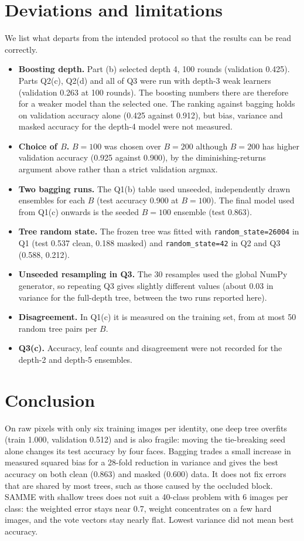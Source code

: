 \documentclass[10pt,twocolumn,letterpaper]{article}
\begin{document}
\section{Deviations and limitations}
\label{sec:limits}
We list what departs from the intended protocol so that the results can be read correctly.
\begin{itemize}\setlength\itemsep{0pt}
\item \textbf{Boosting depth.} Part (b) selected depth 4, 100 rounds (validation 0.425). Parts Q2(c), Q2(d) and all of Q3 were run with depth-3 weak learners (validation 0.263 at 100 rounds). The boosting numbers there are therefore for a weaker model than the selected one. The ranking against bagging holds on validation accuracy alone (0.425 against 0.912), but bias, variance and masked accuracy for the depth-4 model were not measured.
\item \textbf{Choice of $B$.} $B{=}100$ was chosen over $B{=}200$ although $B{=}200$ has higher validation accuracy (0.925 against 0.900), by the diminishing-returns argument above rather than a strict validation argmax.
\item \textbf{Two bagging runs.} The Q1(b) table used unseeded, independently drawn ensembles for each $B$ (test accuracy 0.900 at $B{=}100$). The final model used from Q1(c) onwards is the seeded $B{=}100$ ensemble (test 0.863).
\item \textbf{Tree random state.} The frozen tree was fitted with \texttt{random\_state=26004} in Q1 (test 0.537 clean, 0.188 masked) and \texttt{random\_state=42} in Q2 and Q3 (0.588, 0.212).
\item \textbf{Unseeded resampling in Q3.} The 30 resamples used the global NumPy generator, so repeating Q3 gives slightly different values (about 0.03 in variance for the full-depth tree, between the two runs reported here).
\item \textbf{Disagreement.} In Q1(c) it is measured on the training set, from at most 50 random tree pairs per $B$.
\item \textbf{Q3(c).} Accuracy, leaf counts and disagreement were not recorded for the depth-2 and depth-5 ensembles.
\end{itemize}

\section{Conclusion}
On raw pixels with only six training images per identity, one deep tree overfits (train 1.000, validation 0.512) and is also fragile: moving the tie-breaking seed alone changes its test accuracy by four faces. Bagging trades a small increase in measured squared bias for a 28-fold reduction in variance and gives the best accuracy on both clean (0.863) and masked (0.600) data. It does not fix errors that are shared by most trees, such as those caused by the occluded block. SAMME with shallow trees does not suit a 40-class problem with 6 images per class: the weighted error stays near 0.7, weight concentrates on a few hard images, and the vote vectors stay nearly flat. Lowest variance did not mean best accuracy.
\end{document}
